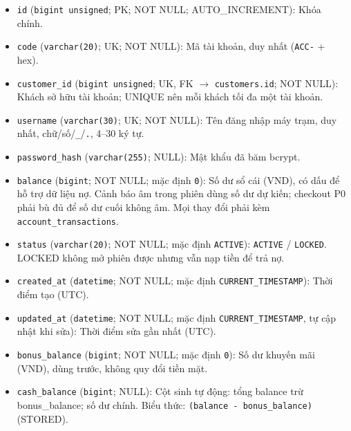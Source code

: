 \begin{itemize}

\item \texttt{id} (\texttt{bigint unsigned}; PK; NOT NULL; AUTO_INCREMENT): Khóa chính.

\item \texttt{code} (\texttt{varchar(20)}; UK; NOT NULL): Mã tài khoản, duy nhất (\texttt{ACC-} + hex).

\item \texttt{customer\_id} (\texttt{bigint unsigned}; UK, FK $\rightarrow$ \texttt{customers.id}; NOT NULL): Khách sở hữu tài khoản; UNIQUE nên mỗi khách tối đa một tài khoản.

\item \texttt{username} (\texttt{varchar(30)}; UK; NOT NULL): Tên đăng nhập máy trạm, duy nhất, chữ/số/\texttt{\_}/\texttt{.}, 4–30 ký tự.

\item \texttt{password\_hash} (\texttt{varchar(255)}; NULL): Mật khẩu đã băm bcrypt.

\item \texttt{balance} (\texttt{bigint}; NOT NULL; mặc định \texttt{0}): Số dư sổ cái (VND), có dấu để hỗ trợ dữ liệu nợ. Cảnh báo âm trong phiên dùng số dư dự kiến; checkout P0 phải bù đủ để số dư cuối không âm. Mọi thay đổi phải kèm \texttt{account\_transactions}.

\item \texttt{status} (\texttt{varchar(20)}; NOT NULL; mặc định \texttt{ACTIVE}): \texttt{ACTIVE} / \texttt{LOCKED}. LOCKED không mở phiên được nhưng vẫn nạp tiền để trả nợ.

\item \texttt{created\_at} (\texttt{datetime}; NOT NULL; mặc định \texttt{CURRENT\_TIMESTAMP}): Thời điểm tạo (UTC).

\item \texttt{updated\_at} (\texttt{datetime}; NOT NULL; mặc định \texttt{CURRENT\_TIMESTAMP}, tự cập nhật khi sửa): Thời điểm sửa gần nhất (UTC).

\item \texttt{bonus\_balance} (\texttt{bigint}; NOT NULL; mặc định \texttt{0}): Số dư khuyến mãi (VND), dùng trước, không quy đổi tiền mặt.

\item \texttt{cash\_balance} (\texttt{bigint}; NULL): Cột sinh tự động: tổng balance trừ bonus_balance; số dư chính. Biểu thức: \texttt{(balance - bonus\_balance)} (STORED).


\end{itemize}
